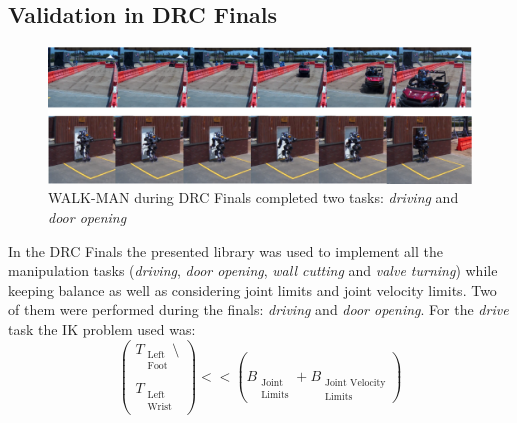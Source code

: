 

\subsection{Validation in DRC Finals}
\begin{figure}
\vspace{2 mm}
\centering \includegraphics[width=\textwidth]{images/wholebody/walkman_drc.eps} 
\caption{WALK-MAN during DRC Finals completed two tasks: \emph{driving} and \emph{door opening}} 
\label{walkman_drc}
\end{figure}
In the DRC Finals the presented library was used to implement all the manipulation tasks (\emph{driving}, \emph{door opening}, \emph{wall cutting} and \emph{valve turning}) while keeping balance as well as considering joint limits and joint velocity limits. Two of them were performed during the finals: \emph{driving} and \emph{door opening}. 
For the \emph{drive} task the IK problem used was:
\begin{equation}
\begin{pmatrix}
T_{\substack{\text{Left}\\\text{Foot}}}\setminus\\
\\
T_{\substack{\text{Left}\\\text{Wrist}}}
\end{pmatrix}
<< \left(B_{\substack{\text{Joint}\\\text{Limits}}} + B_{\substack{\text{Joint Velocity}\\\text{Limits}}}\right)
\end{equation}

